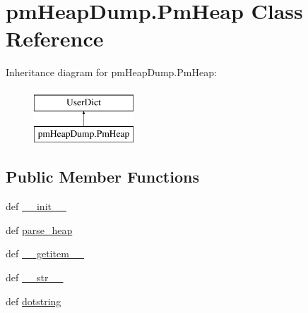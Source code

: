 \hypertarget{classpm_heap_dump_1_1_pm_heap}{\section{pm\-Heap\-Dump.\-Pm\-Heap Class Reference}
\label{classpm_heap_dump_1_1_pm_heap}
}
Inheritance diagram for pm\-Heap\-Dump.\-Pm\-Heap\-:\begin{figure}[H]
\begin{center}
\leavevmode
\includegraphics[height=2.000000cm]{classpm_heap_dump_1_1_pm_heap}
\end{center}
\end{figure}
\subsection*{Public Member Functions}
\begin{DoxyCompactItemize}
\item 
def \hyperlink{classpm_heap_dump_1_1_pm_heap_aa7ae64ddb31003e7196d81be689aa6c4}{\-\_\-\-\_\-init\-\_\-\-\_\-}
\item 
def \hyperlink{classpm_heap_dump_1_1_pm_heap_a1762a60a8abf34dee2f3dd3abc43366c}{parse\-\_\-heap}
\item 
def \hyperlink{classpm_heap_dump_1_1_pm_heap_af779f01cc716111a81fb1c0077ee8361}{\-\_\-\-\_\-getitem\-\_\-\-\_\-}
\item 
def \hyperlink{classpm_heap_dump_1_1_pm_heap_a825555a16aac96eeb6a06b4870ced8b3}{\-\_\-\-\_\-str\-\_\-\-\_\-}
\item 
def \hyperlink{classpm_heap_dump_1_1_pm_heap_a31b34b685369853640ee214e119e70a2}{dotstring}
\end{DoxyCompactItemize}
